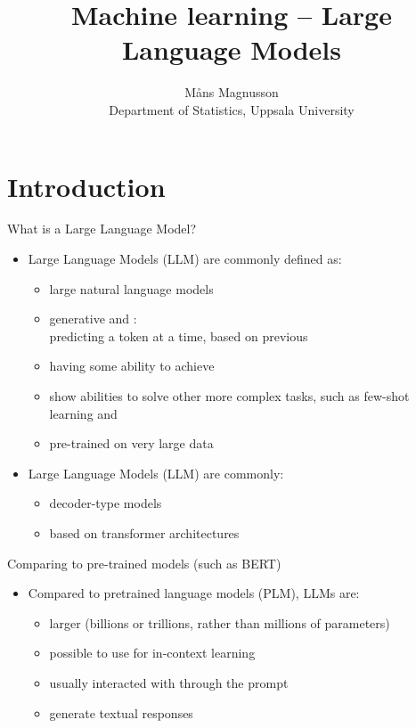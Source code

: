 \documentclass[10pt]{beamer}
\title[]{{\color{black}Machine learning -- Large Language Models}}
\author[]{M{\aa}ns Magnusson\\Department of Statistics, Uppsala University}
\date{\currentsemester}
\begin{document}
\frame{\titlepage
}





\section{Introduction} %
\frame{\sectionpage}

\begin{frame}{What is a Large Language Model?}

\begin{itemize}
  \item Large Language Models (LLM) are commonly defined as:
  \begin{itemize}
      \item large natural language models
      \pause
      \item generative and :
      \\predicting a token at a time, based on previous 
      \pause
      \item having some ability to achieve 
      \item show  abilities to solve other more complex tasks, such as few-shot learning and 
      \pause
      \item pre-trained on very large data
  \end{itemize}
  \item Large Language Models (LLM) are commonly:
  \begin{itemize}
    \item decoder-type models
    \pause
    \item based on transformer architectures
  \end{itemize}
\end{itemize}

\end{frame}

\begin{frame}{Comparing to pre-trained models (such as BERT)}

\begin{itemize}
  \item Compared to pretrained language models (PLM), LLMs are:
  \begin{itemize}
      \item larger (billions or trillions, rather than millions of parameters)\pause
      \item possible to use for in-context learning\pause
      \item usually interacted with through the prompt\pause
      \item generate textual responses
  \end{itemize}
\end{itemize}

\end{frame}
\end{document}
